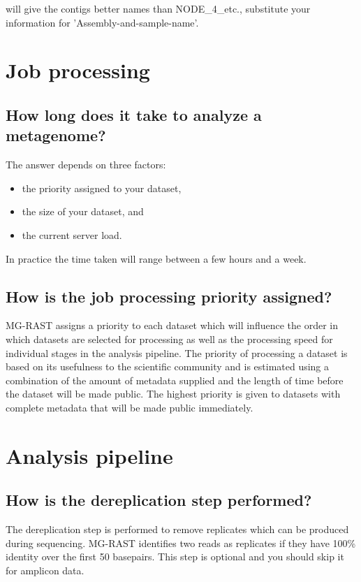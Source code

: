 \documentclass[letterpaper,10pt,english]{sphinxmanual}
\begin{document}
will give the contigs better names than NODE\_4\_etc., substitute your
information for ’Assembly-and-sample-name’.


\section{Job processing}
\label{\detokenize{user_manual:job-processing}}

\subsection{How long does it take to analyze a metagenome?}
\label{\detokenize{user_manual:how-long-does-it-take-to-analyze-a-metagenome}}
The answer depends on three factors:
\begin{itemize}
\item {} 
the priority assigned to your dataset,

\item {} 
the size of your dataset, and

\item {} 
the current server load.

\end{itemize}

In practice the time taken will range between a few hours and a week.


\subsection{How is the job processing priority assigned?}
\label{\detokenize{user_manual:how-is-the-job-processing-priority-assigned}}
MG-RAST assigns a priority to each dataset which will influence the
order in which datasets are selected for processing as well as the
processing speed for individual stages in the analysis pipeline. The
priority of processing a dataset is based on its usefulness to the
scientific community and is estimated using a combination of the amount
of metadata supplied and the length of time before the dataset will be
made public. The highest priority is given to datasets with complete
metadata that will be made public immediately.


\section{Analysis pipeline}
\label{\detokenize{user_manual:analysis-pipeline}}

\subsection{How is the dereplication step performed?}
\label{\detokenize{user_manual:how-is-the-dereplication-step-performed}}
The dereplication step is performed to remove replicates which can be
produced during sequencing. MG-RAST identifies two reads as replicates
if they have 100\% identity over the first 50 basepairs. This step is
optional and you should skip it for amplicon data.
\end{document}

